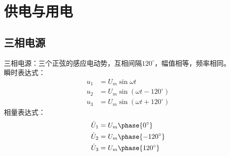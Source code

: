 \section{供电与用电}

\subsection{三相电源}

三相电源：三个正弦的感应电动势，互相间隔$120^\circ$，幅值相等，频率相同。\\
瞬时表达式：
\begin{equation}
    \begin{aligned}
        u_{1} &= U_m \sin \omega t \\
        u_{2} &= U_m \sin (\omega t - 120^\circ) \\
        u_{3} &= U_m \sin (\omega t + 120^\circ)
    \end{aligned}
\end{equation}
\noindent 相量表达式：
\begin{equation}
    \begin{aligned}
        \dot{U}_{1} &= U_m \phase{ 0^\circ }\\
        \dot{U}_{2} &= U_m \phase{ -120^\circ} \\
        \dot{U}_{3} &= U_m \phase{ 120^\circ}
    \end{aligned}
\end{equation}

